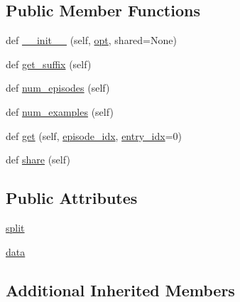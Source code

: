 \subsection*{Public Member Functions}
\begin{DoxyCompactItemize}
\item 
def \hyperlink{classparlai_1_1tasks_1_1dstc7_1_1agents_1_1DSTC7Teacher_a5773b0073045b31e9308070e271e8b15}{\+\_\+\+\_\+init\+\_\+\+\_\+} (self, \hyperlink{classparlai_1_1core_1_1agents_1_1Teacher_a3ce6243860ce978a897922863ed32fa4}{opt}, shared=None)
\item 
def \hyperlink{classparlai_1_1tasks_1_1dstc7_1_1agents_1_1DSTC7Teacher_a2355675a4798e716d6d5788ba9de109e}{get\+\_\+suffix} (self)
\item 
def \hyperlink{classparlai_1_1tasks_1_1dstc7_1_1agents_1_1DSTC7Teacher_a259540f4c5e9d81c2295a2a45f3f87dd}{num\+\_\+episodes} (self)
\item 
def \hyperlink{classparlai_1_1tasks_1_1dstc7_1_1agents_1_1DSTC7Teacher_aeaff98c183e9c50d97f84c9c3d387aac}{num\+\_\+examples} (self)
\item 
def \hyperlink{classparlai_1_1tasks_1_1dstc7_1_1agents_1_1DSTC7Teacher_adceeb772d4efa50b44f502d38bdb3049}{get} (self, \hyperlink{classparlai_1_1core_1_1teachers_1_1FixedDialogTeacher_afd4ebab8063eb42d182d30a1a41f133e}{episode\+\_\+idx}, \hyperlink{classparlai_1_1core_1_1teachers_1_1FixedDialogTeacher_ae3201b15f3c3b46a2f3511bad9b43e7d}{entry\+\_\+idx}=0)
\item 
def \hyperlink{classparlai_1_1tasks_1_1dstc7_1_1agents_1_1DSTC7Teacher_ae7b7bba23f2f3914186915824280a5d5}{share} (self)
\end{DoxyCompactItemize}
\subsection*{Public Attributes}
\begin{DoxyCompactItemize}
\item 
\hyperlink{classparlai_1_1tasks_1_1dstc7_1_1agents_1_1DSTC7Teacher_a441e080f8a4514fb9c3b8a1872dea4e3}{split}
\item 
\hyperlink{classparlai_1_1tasks_1_1dstc7_1_1agents_1_1DSTC7Teacher_a1410f6e230ea0a01e373e2dde387440a}{data}
\end{DoxyCompactItemize}
\subsection*{Additional Inherited Members}


